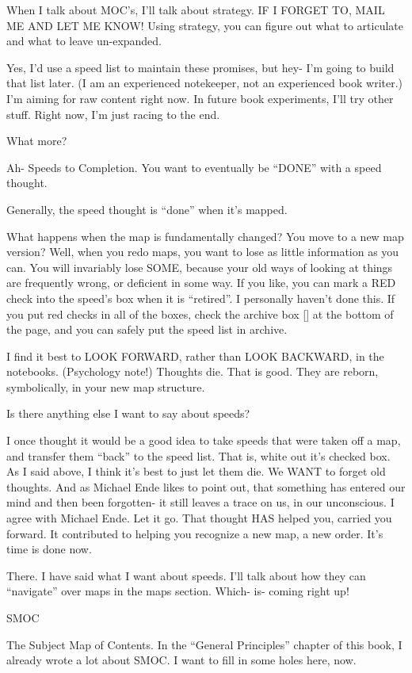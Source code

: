 \documentclass[oneside]{book}
\begin{document}
When I talk about MOC's, I'll talk about strategy. IF I FORGET TO,
MAIL ME AND LET ME KNOW! Using strategy, you can figure out what to
articulate and what to leave un-expanded.

Yes, I'd use a speed list to maintain these promises, but hey- I'm
going to build that list later. (I am an experienced notekeeper, not
an experienced book writer.) I'm aiming for raw content right now. In
future book experiments, I'll try other stuff. Right now, I'm just
racing to the end.

What more?

Ah- Speeds to Completion. You want to eventually be ``DONE'' with a
speed thought.

Generally, the speed thought is ``done'' when it's mapped.

What happens when the map is fundamentally changed? You move to a new
map version? Well, when you redo maps, you want to lose as little
information as you can. You will invariably lose SOME, because your
old ways of looking at things are frequently wrong, or deficient in
some way. If you like, you can mark a RED check into the speed's box
when it is ``retired''. I personally haven't done this. If you put red
checks in all of the boxes, check the archive box [] at the bottom of
the page, and you can safely put the speed list in archive.

I find it best to LOOK FORWARD, rather than LOOK BACKWARD, in the
notebooks. (Psychology note!) Thoughts die. That is good. They are
reborn, symbolically, in your new map structure.

Is there anything else I want to say about speeds?

I once thought it would be a good idea to take speeds that were taken
off a map, and transfer them ``back'' to the speed list. That is, white
out it's checked box. As I said above, I think it's best to just let
them die. We WANT to forget old thoughts. And as Michael Ende likes to
point out, that something has entered our mind and then been
forgotten- it still leaves a trace on us, in our unconscious. I agree
with Michael Ende. Let it go. That thought HAS helped you, carried you
forward. It contributed to helping you recognize a new map, a new
order. It's time is done now.

There. I have said what I want about speeds. I'll talk about how they
can ``navigate'' over maps in the maps section. Which- is- coming right
up!


SMOC

The Subject Map of Contents. In the ``General Principles'' chapter of
this book, I already wrote a lot about SMOC. I want to fill in some
holes here, now.
\end{document}
